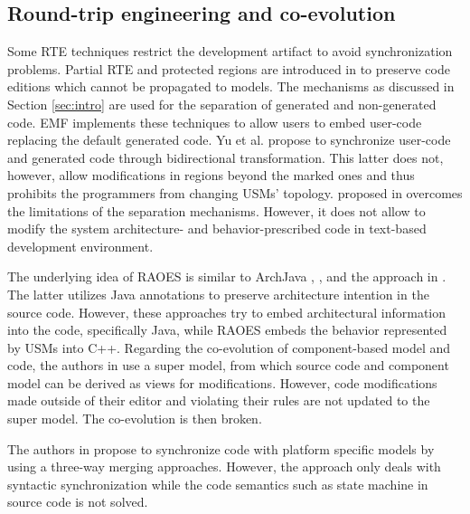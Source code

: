 \subsection{Round-trip engineering and co-evolution}
Some RTE techniques restrict the development artifact to avoid
synchronization problems.
Partial RTE and protected regions are introduced in \cite{czarnecki_multi-level_2006} to preserve code editions which cannot be propagated to models.
The mechanisms as discussed in Section \ref{sec:intro} are used for the separation of generated and non-generated code. 
EMF implements these techniques to allow users to embed user-code replacing the default generated code.
Yu et al. \cite{yu2012maintaining} propose to synchronize user-code and generated code through bidirectional transformation.
This latter does not, however, allow modifications in regions beyond the marked ones and thus prohibits the programmers from changing USMs' topology.
 proposed in \cite{zheng2012enhancing} overcomes the limitations of the separation mechanisms.
However, %
it does not allow to modify the system architecture- and behavior-prescribed code in text-based development environment.  


The underlying idea of RAOES is similar to ArchJava \cite{aldrich2002archjava}, \cite{ubayashi2010archface}, and the approach in \cite{christensen2011towards}.
The latter utilizes Java annotations to preserve architecture intention in the source code.
However, these approaches try to embed architectural information into the code, specifically Java, while RAOES embeds the behavior represented by USMs into C++. 
Regarding the co-evolution of component-based model and code, the authors in \cite{langhammer2013co, kramer2015change} use a super model, from which source code and component model can be derived as views for modifications.
However, code modifications made outside of their editor and violating their rules are not updated to the super model. The co-evolution is then broken.  

The authors in \cite{angyal_synchronizing_2008} propose to synchronize code with platform specific models by using a three-way merging approaches.
However, the approach only deals with syntactic synchronization while the code semantics such as state machine in source code is not solved.

